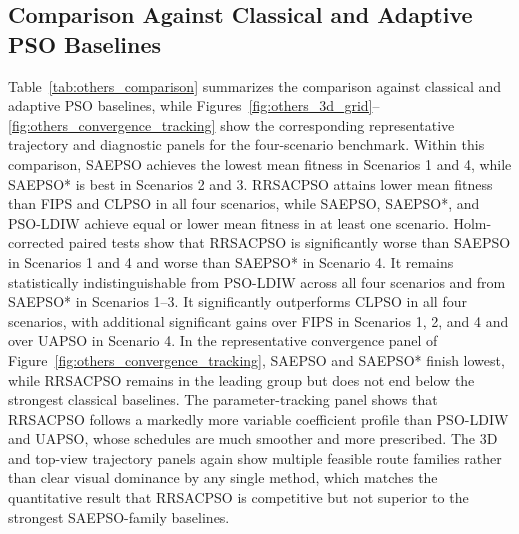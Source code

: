 \documentclass[final,5p,times]{elsarticle}
\begin{document}
\subsection{Comparison Against Classical and Adaptive PSO Baselines}
Table~\ref{tab:others_comparison} summarizes the comparison against classical and adaptive PSO baselines, while Figures~\ref{fig:others_3d_grid}--\ref{fig:others_convergence_tracking} show the corresponding representative trajectory and diagnostic panels for the four-scenario benchmark.
Within this comparison, SAEPSO achieves the lowest mean fitness in Scenarios 1 and 4, while SAEPSO* is best in Scenarios 2 and 3.
RRSACPSO attains lower mean fitness than FIPS and CLPSO in all four scenarios, while SAEPSO, SAEPSO*, and PSO-LDIW achieve equal or lower mean fitness in at least one scenario.
Holm-corrected paired tests show that RRSACPSO is significantly worse than SAEPSO in Scenarios 1 and 4 and worse than SAEPSO* in Scenario 4.
It remains statistically indistinguishable from PSO-LDIW across all four scenarios and from SAEPSO* in Scenarios 1--3.
It significantly outperforms CLPSO in all four scenarios, with additional significant gains over FIPS in Scenarios 1, 2, and 4 and over UAPSO in Scenario 4.
In the representative convergence panel of Figure~\ref{fig:others_convergence_tracking}, SAEPSO and SAEPSO* finish lowest, while RRSACPSO remains in the leading group but does not end below the strongest classical baselines.
The parameter-tracking panel shows that RRSACPSO follows a markedly more variable coefficient profile than PSO-LDIW and UAPSO, whose schedules are much smoother and more prescribed.
The 3D and top-view trajectory panels again show multiple feasible route families rather than clear visual dominance by any single method, which matches the quantitative result that RRSACPSO is competitive but not superior to the strongest SAEPSO-family baselines.
\end{document}
